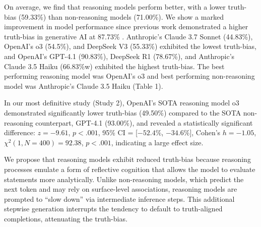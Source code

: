 \documentclass{article}
\begin{document}
On average, we find that reasoning models perform better, with a lower truth-bias (59.33\%) than non-reasoning models (71.00\%). We show a marked improvement in model performance since previous work demonstrated a higher truth-bias in generative AI at 87.73\% \citep{markowitz_generative_2024}. Anthropic's Claude 3.7 Sonnet (44.83\%), OpenAI's o3 (54.5\%), and DeepSeek V3 (55.33\%) exhibited the lowest truth-bias, and OpenAI's GPT-4.1 (90.83\%), DeepSeek R1 (78.67\%), and Anthropic's Claude 3.5 Haiku (66.83\%w) exhibited the highest truth-bias. The best performing reasoning model was OpenAI's o3 and best performing non-reasoning model was Anthropic's Claude 3.5 Haiku (Table 1).

In our most definitive study (Study 2), OpenAI's SOTA reasoning model o3 demonstrated significantly lower truth-bias (49.50\%) compared to the SOTA non-reasoning counterpart, GPT-4.1 (93.00\%), and revealed a statistically significant difference: $z = -9.61$, $p < .001$, 95\% CI = [$-52.4\%$, $-34.6\%$], Cohen’s $h = -1.05$, $\chi^2(1, N = 400) = 92.38$, $p < .001$, indicating a large effect size.

We propose that reasoning models exhibit reduced truth-bias because reasoning processes emulate a form of reflective cognition that allows the model to evaluate statements more analytically. Unlike non-reasoning models, which predict the next token and may rely on surface-level associations, reasoning models are prompted to ``slow down'' via intermediate inference steps. This additional stepwise generation interrupts the tendency to default to truth-aligned completions, attenuating the truth-bias.
\end{document}
